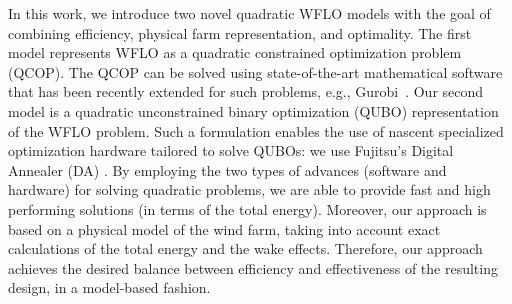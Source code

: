 \documentclass[preprint,12pt]{elsarticle}
\begin{document}

In this work, we introduce two novel quadratic WFLO models with the goal 
of combining efficiency, physical farm representation, and optimality. The first
model represents WFLO as a quadratic constrained optimization
problem (QCOP).  The QCOP can be solved using state-of-the-art mathematical software
that has been recently extended for such problems, e.g., Gurobi~\cite{gurobi}.  Our
second model is a quadratic unconstrained binary optimization
(QUBO) representation of the WFLO problem.  Such a formulation enables the use of
nascent specialized optimization hardware tailored to solve QUBOs: we use Fujitsu's Digital Annealer (DA) \cite{aramon2019physics}. By employing the two types of advances (software and hardware) for solving
quadratic problems, 
we are able to provide fast and high performing solutions (in terms of the total energy). Moreover, our approach is based
on a physical model of the wind farm, taking into account
exact calculations of the total energy and the wake effects. 
Therefore, our approach achieves the desired balance between efficiency and effectiveness of the resulting design, in a model-based fashion.
\end{document}
